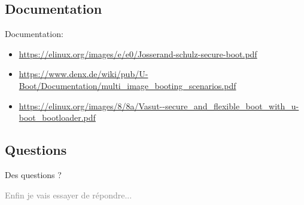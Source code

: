 \documentclass[aspectratio=169]{beamer}
\begin{document}
\subsection{Documentation}

\begin{frame}[fragile]
Documentation:
\begin{itemize}
\item \url{https://elinux.org/images/e/e0/Josserand-schulz-secure-boot.pdf}
\item \url{https://www.denx.de/wiki/pub/U-Boot/Documentation/multi_image_booting_scenarios.pdf}
\item \url{https://elinux.org/images/8/8a/Vasut--secure_and_flexible_boot_with_u-boot_bootloader.pdf}
\end{itemize}
\end{frame}

\subsection{Questions}

\begin{frame}
\begin{center}
\begin{huge}
Des questions ?
\end{huge}
\end{center}
\begin{center}
\textcolor{gray}{\tiny{Enfin je vais essayer de répondre...}}
\end{center}
\vfill
{}
\end{frame}
\end{document}
